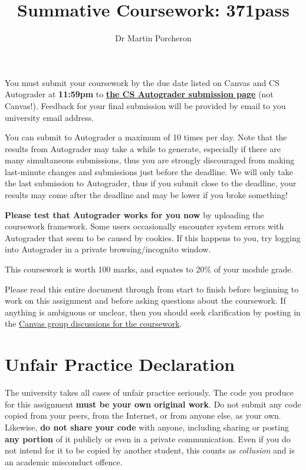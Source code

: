 \documentclass[a4paper]{article}
\title{Summative Coursework: 371pass}
\author{Dr Martin Porcheron}
\date{}
\newcommand\submissionlink{\href{https://csautograder.swansea.ac.uk/web/project/31}{the CS Autograder submission page}}
\begin{document}
\maketitle


You must submit your coursework by the due date listed on Canvas and CS Autograder at \textbf{11:59pm} to \textbf{\submissionlink{}} (not Canvas!). Feedback for your final submission will be provided by email to you university email address.

You can submit to Autograder a maximum of 10 times per day. Note that the results from Autograder may take a while to generate, especially if there are many simultaneous submissions, thus you are strongly discouraged from making last‑minute changes and submissions just before the deadline. We will only take the last submission to Autograder, thus if you submit close to the deadline, your results may come after the deadline and may be lower if you broke something!

\textbf{Please test that Autograder works for you now} by uploading the coursework framework. Some users occasionally encounter system errors with Autograder that seem to be caused by cookies. If this happens to you, try logging into Autograder in a private browsing/incognito window.

This coursework is worth 100 marks, and equates to 20\% of your module grade.

Please read this entire document through from start to finish before beginning to work on this assignment and before asking questions about the coursework. If anything is ambiguous or unclear, then you should seek clarification by posting in the \href{https://canvas.swansea.ac.uk/courses/24793/discussion_topics/217912}{Canvas group discussions for the coursework}.





\section*{Unfair Practice Declaration}\label{sec:unfair-practice}
The university takes all cases of unfair practice seriously. The code you produce for this assignment \textbf{must be your own original work}. Do not submit any code copied from your peers, from the Internet, or from anyone else, as your own. Likewise, \textbf{do not share your code} with anyone, including sharing or posting \textbf{any portion} of it publicly or even in a private communication. Even if you do not intend for it to be copied by another student, this counts as \emph{collusion} and is an academic misconduct offence.
\end{document}
